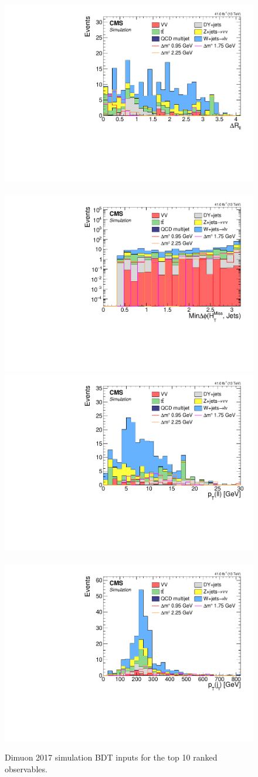 \begin{figure}[!htb]
\includegraphics[width=0.48\linewidth]{plots/dilepton_muons_2017/none_deltaRCorrJetNoMultIso10Dr0.6.pdf} \,
\includegraphics[width=0.48\linewidth]{plots/dilepton_muons_2017/none_MinDeltaPhiMhtJets_log.pdf} \\

\includegraphics[width=0.48\linewidth]{plots/dilepton_muons_2017/none_dileptonPtCorrJetNoMultIso10Dr0.6.pdf} \,
\includegraphics[width=0.48\linewidth]{plots/dilepton_muons_2017/none_LeadingJetPt.pdf} \\



\caption[Dimuon simulation BDT inputs]{Dimuon 2017 simulation BDT inputs for the top 10 ranked observables.}
\label{fig:dimuon-bdt-sim-inputs}
\end{figure}

